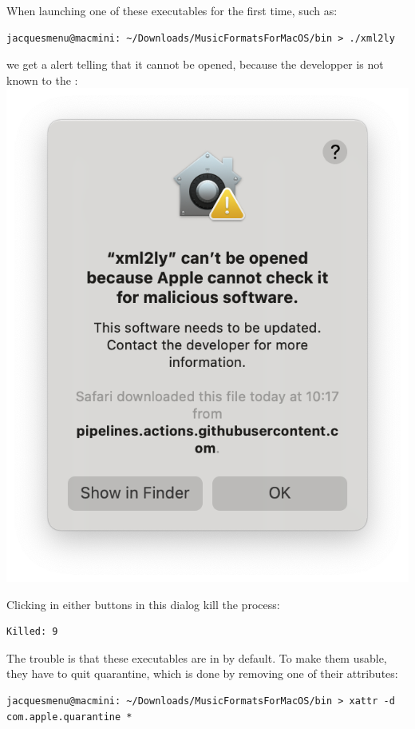 When launching one of these executables for the first time, such as:
\begin{lstlisting}[language=Terminal]
jacquesmenu@macmini: ~/Downloads/MusicFormatsForMacOS/bin > ./xml2ly
\end{lstlisting}
we get a alert telling that it cannot be opened, because the developper is not known to the \OS:\\
\includegraphics[scale=0.35]{../mfgraphics/mfgraphicsMacOSMaliciousSoftwareAlert.png}

Clicking in either buttons in this dialog kill the process:
\begin{lstlisting}[language=Terminal]
Killed: 9
\end{lstlisting}

The trouble is that these executables are in {\it \quarantine} by default. To make them usable, they have to quit quarantine, which is done by removing one of their attributes:
\begin{lstlisting}[language=Terminal]
jacquesmenu@macmini: ~/Downloads/MusicFormatsForMacOS/bin > xattr -d com.apple.quarantine *
\end{lstlisting}

